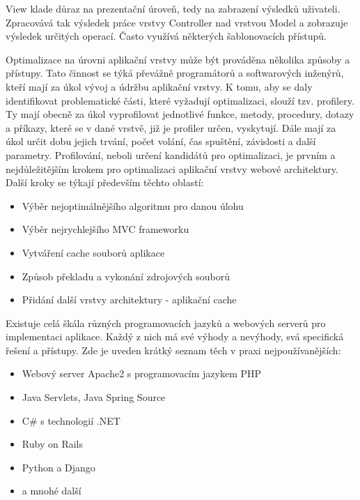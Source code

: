 \documentclass[12pt]{article}
\begin{document}
View klade důraz na prezentační úroveň, tedy na zabrazení výsledků uživateli. Zpracovává tak výsledek práce vrstvy Controller nad vrstvou Model a zobrazuje výsledek určitých operací. Často využívá některých šablonovacích přístupů. \cite{design-patterns}

\clearpage

\obrazek
{}

\label{sec:profiler}
Optimalizace na úrovni aplikační vrstvy může být prováděna několika způsoby a přístupy. Tato činnost se týká převážně programátorů a softwarových inženýrů, kteří mají za úkol vývoj a údržbu aplikační vrstvy. K tomu, aby se daly identifikovat problematické části, které vyžadují optimalizaci, slouží tzv. profilery. Ty mají obecně za úkol vyprofilovat jednotlivé funkce, metody, procedury, dotazy a příkazy, které se v dané vrstvě, již je profiler určen, vyskytují. Dále mají za úkol určit dobu jejich trvání, počet volání, čas spuštění, závislosti a další parametry. Profilování, neboli určení kandidátů pro optimalizaci, je prvním a nejdůležitějším krokem pro optimalizaci aplikační vrstvy webové architektury. Další kroky se týkají především těchto oblastí:

\begin{itemize}
\item Výběr nejoptimálnějšího algoritmu pro danou úlohu
\item Výběr nejrychlejšího MVC frameworku
\item Vytváření cache souborů aplikace
\item Způsob překladu a vykonání zdrojových souborů
\item Přidání další vrstvy architektury - aplikační cache
\end{itemize}

Existuje celá škála různých programovacích jazyků a webových serverů pro implementaci aplikace. Každý z nich má své výhody a nevýhody, svá specifická řešení a přístupy. Zde je uveden krátký seznam těch v praxi nejpoužívanějších:

\begin{itemize}
\item Webový server Apache2 s programovacím jazykem PHP
\item Java Servlets, Java Spring Source
\item C\# s technologií .NET
\item Ruby on Rails
\item Python a Django
\item a mnohé další
\end{itemize}
\end{document}
